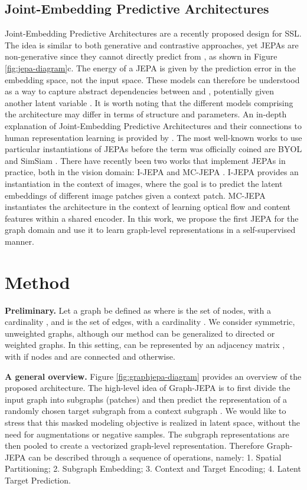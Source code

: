 \documentclass{article} \usepackage{iclr2024_conference,times}
\begin{document}
\subsection{Joint-Embedding Predictive Architectures}
Joint-Embedding Predictive Architectures \citep{lecun2022path} are a recently proposed design for SSL. The idea is similar to both generative and contrastive approaches, yet JEPAs are non-generative since they cannot directly predict  from , as shown in Figure \ref{fig:jepa-diagram}c. The energy of a JEPA is given by the prediction error in the embedding space, not the input space. These models can therefore be understood as a way to capture abstract dependencies between  and , potentially given another latent variable . It is worth noting that the different models comprising the architecture may differ in terms of structure and parameters. An in-depth explanation of Joint-Embedding Predictive Architectures and their connections to human representation learning is provided by \citet{lecun2022path}. The most well-known works to use particular instantiations of JEPAs before the term was officially coined are BYOL \citep{grill2020bootstrap} and SimSiam \citep{chen2021exploring}. There have recently been two works that implement JEPAs in practice, both in the vision domain: I-JEPA \citep{assran2023self} and MC-JEPA \citep{bardes2023mc}. I-JEPA provides an instantiation in the context of images, where the goal is to predict the latent embeddings of different image patches given a context patch. MC-JEPA instantiates the architecture in the context of learning optical flow and content features within a shared encoder. In this work, we propose the first JEPA for the graph domain and use it to learn graph-level representations in a self-supervised manner.

\section{Method}
\textbf{Preliminary.} Let a graph  be defined as  where  is the set of nodes, with a cardinality , and  is the set of edges, with a cardinality . We consider symmetric, unweighted graphs, although our method can be generalized to directed or weighted graphs. In this setting,  can be represented by an adjacency matrix , with  if nodes  and  are connected and  otherwise.

\textbf{A general overview.} Figure \ref{fig:graphjepa-diagram} provides an overview of the proposed architecture. The high-level idea of Graph-JEPA is to first divide the input graph into subgraphs (patches) \citep{he2023generalization} and then predict the representation of a randomly chosen target subgraph from a context subgraph \citep{assran2023self}. We would like to stress that this masked modeling objective is realized in latent space, without the need for augmentations or negative samples. The subgraph representations are then pooled to create a vectorized graph-level representation. Therefore Graph-JEPA can be described through a sequence of operations, namely: 1. Spatial Partitioning; 2. Subgraph Embedding; 3. Context and Target Encoding; 4. Latent Target Prediction.
\end{document}
